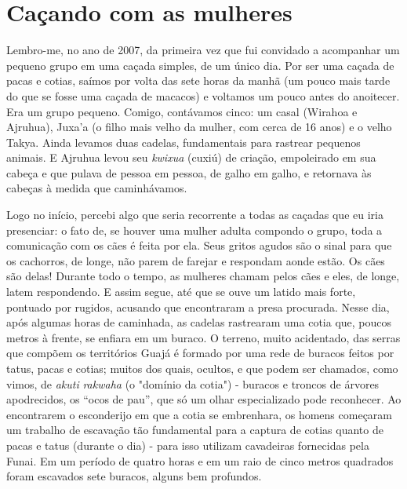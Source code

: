 \section{Caçando com as mulheres}

Lembro-me, no ano de 2007, da primeira vez que fui convidado a
acompanhar um pequeno grupo em uma caçada simples, de um único dia. Por
ser uma caçada de pacas e cotias, saímos por volta das sete horas da
manhã (um pouco mais tarde do que se fosse uma caçada de macacos) e
voltamos um pouco antes do anoitecer. Era um grupo pequeno. Comigo,
contávamos cinco: um casal (Wirahoa e Ajruhua), Juxa'a (o filho mais
velho da mulher, com cerca de 16 anos) e o velho Takya. Ainda levamos
duas cadelas, fundamentais para rastrear pequenos animais. E Ajruhua
levou seu \emph{kwixua} (cuxiú) de criação, empoleirado em sua cabeça e
que pulava de pessoa em pessoa, de galho em galho, e retornava às
cabeças à medida que caminhávamos.

Logo no início, percebi algo que seria recorrente a todas as caçadas que
eu iria presenciar: o fato de, se houver uma mulher adulta compondo o
grupo, toda a comunicação com os cães é feita por ela. Seus gritos
agudos são o sinal para que os cachorros, de longe, não parem de farejar
e respondam aonde estão. Os cães são delas! Durante todo o tempo, as
mulheres chamam pelos cães e eles, de longe, latem respondendo. E assim
segue, até que se ouve um latido mais forte, pontuado por rugidos,
acusando que encontraram a presa procurada. Nesse dia, após algumas
horas de caminhada, as cadelas rastrearam uma cotia que, poucos metros à
frente, se enfiara em um buraco. O terreno, muito acidentado, das serras
que compõem os territórios Guajá é formado por uma rede de buracos
feitos por tatus, pacas e cotias; muitos dos quais, ocultos, e que podem
ser chamados, como vimos, de \emph{akuti} \emph{rakwaha} (o "domínio da
cotia") - buracos e troncos de árvores apodrecidos, os ``ocos de pau'',
que só um olhar especializado pode reconhecer. Ao encontrarem o
esconderijo em que a cotia se embrenhara, os homens começaram um
trabalho de escavação tão fundamental para a captura de cotias quanto de
pacas e tatus (durante o dia) - para isso utilizam cavadeiras fornecidas
pela Funai. Em um período de quatro horas e em um raio de cinco metros
quadrados foram escavados sete buracos, alguns bem profundos.

